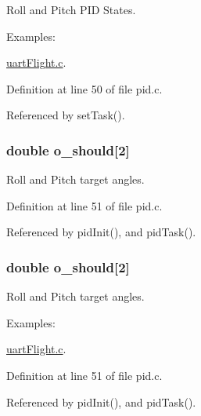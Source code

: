 Roll and Pitch P\-I\-D States. 

\begin{Desc}
\item[Examples\-: ]\par
\hyperlink{uart_flight_8c-example}{uart\-Flight.\-c}.\end{Desc}


Definition at line 50 of file pid.\-c.



Referenced by set\-Task().

\hypertarget{group__pid_ga3e9b95260c17d0da155fb4eede660d03}{
\subsubsection[{o\-\_\-should}]{\setlength{\rightskip}{0pt plus 5cm}double o\-\_\-should\mbox{[}2\mbox{]}}}\label{group__pid_ga3e9b95260c17d0da155fb4eede660d03}


Roll and Pitch target angles. 



Definition at line 51 of file pid.\-c.



Referenced by pid\-Init(), and pid\-Task().

\hypertarget{group__pid_ga3e9b95260c17d0da155fb4eede660d03}{
\subsubsection[{o\-\_\-should}]{\setlength{\rightskip}{0pt plus 5cm}double o\-\_\-should\mbox{[}2\mbox{]}}}\label{group__pid_ga3e9b95260c17d0da155fb4eede660d03}


Roll and Pitch target angles. 

\begin{Desc}
\item[Examples\-: ]\par
\hyperlink{uart_flight_8c-example}{uart\-Flight.\-c}.\end{Desc}


Definition at line 51 of file pid.\-c.



Referenced by pid\-Init(), and pid\-Task().

